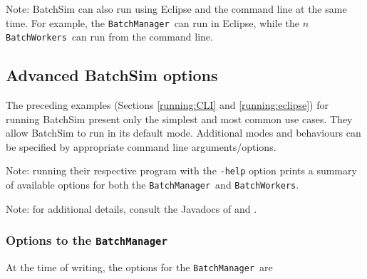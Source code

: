 \documentclass{article}
\newcommand{\BM}{{\tt BatchManager}}
\newcommand{\BWs}{{\tt BatchWorkers}}
\begin{document}
\begin{sideblock}
Note: BatchSim can also run using Eclipse and the command line at the same time. For example, the \BM\ can run in Eclipse, while the $n$ \BWs\ can run from the command line.
\end{sideblock}

\subsection{Advanced BatchSim options}

The preceding examples (Sections \ref{running:CLI} and \ref{running:eclipse}) for running BatchSim present only the simplest and most common use cases. They allow BatchSim to run in its default mode. Additional modes and behaviours can be specified by appropriate command line arguments/options.

\begin{sideblock}
Note: running their respective program with the {\tt -help} option prints a summary of available options for both the \BM\ and \BWs.
\end{sideblock}

\begin{sideblock}
Note: for additional details, consult the Javadocs of  and .
\end{sideblock}

\subsubsection{Options to the \BM}
\label{running:advanced:BM}

At the time of writing, the options for the \BM\ are
\end{document}
